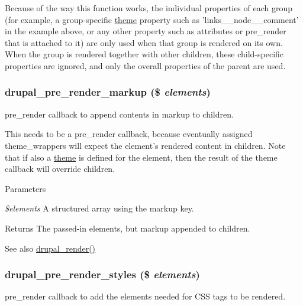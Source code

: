 Because of the way this function works, the individual properties of each group (for example, a group-\/specific \hyperlink{includes_2theme_8inc_a7c25609a935874541a19657affd30fff}{theme} property such as 'links\_\-\_\-node\_\-\_\-comment' in the example above, or any other property such as attributes or pre\_\-render that is attached to it) are only used when that group is rendered on its own. When the group is rendered together with other children, these child-\/specific properties are ignored, and only the overall properties of the parent are used. \hypertarget{common_8inc_a3367ec9635e712d363e2363d16558128}{
\subsubsection[{drupal\_\-pre\_\-render\_\-markup}]{\setlength{\rightskip}{0pt plus 5cm}drupal\_\-pre\_\-render\_\-markup (\$ {\em elements})}}
\label{common_8inc_a3367ec9635e712d363e2363d16558128}
pre\_\-render callback to append contents in markup to children.

This needs to be a pre\_\-render callback, because eventually assigned theme\_\-wrappers will expect the element's rendered content in children. Note that if also a \hyperlink{includes_2theme_8inc_a7c25609a935874541a19657affd30fff}{theme} is defined for the element, then the result of the theme callback will override children.


\begin{DoxyParams}{Parameters}
\item[{\em \$elements}]A structured array using the markup key.\end{DoxyParams}
\begin{DoxyReturn}{Returns}
The passed-\/in elements, but markup appended to children.
\end{DoxyReturn}
\begin{DoxySeeAlso}{See also}
\hyperlink{common_8inc_a05798b44e8d6c496d4bee5cc32fa7851}{drupal\_\-render()} 
\end{DoxySeeAlso}
\hypertarget{common_8inc_a4b3889176f5132daa3f56a861d19aa95}{
\subsubsection[{drupal\_\-pre\_\-render\_\-styles}]{\setlength{\rightskip}{0pt plus 5cm}drupal\_\-pre\_\-render\_\-styles (\$ {\em elements})}}
\label{common_8inc_a4b3889176f5132daa3f56a861d19aa95}
pre\_\-render callback to add the elements needed for CSS tags to be rendered.

